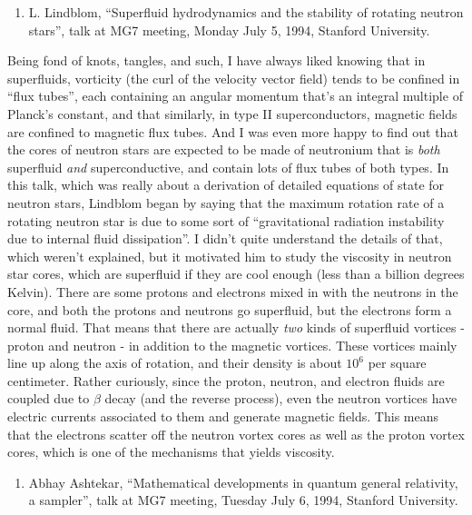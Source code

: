 \documentclass{article}
\def\tightlist{}
\begin{document}
\begin{enumerate}
\def\labelenumi{\arabic{enumi})}
\tightlist
\item
  L. Lindblom, ``Superfluid hydrodynamics and the stability of rotating
  neutron stars'', talk at MG7 meeting, Monday July 5, 1994, Stanford
  University.
\end{enumerate}

Being fond of knots, tangles, and such, I have always liked knowing that
in superfluids, vorticity (the curl of the velocity vector field) tends
to be confined in ``flux tubes'', each containing an angular momentum
that's an integral multiple of Planck's constant, and that similarly, in
type II superconductors, magnetic fields are confined to magnetic flux
tubes. And I was even more happy to find out that the cores of neutron
stars are expected to be made of neutronium that is \emph{both}
superfluid \emph{and} superconductive, and contain lots of flux tubes of
both types. In this talk, which was really about a derivation of
detailed equations of state for neutron stars, Lindblom began by saying
that the maximum rotation rate of a rotating neutron star is due to some
sort of ``gravitational radiation instability due to internal fluid
dissipation''. I didn't quite understand the details of that, which
weren't explained, but it motivated him to study the viscosity in
neutron star cores, which are superfluid if they are cool enough (less
than a billion degrees Kelvin). There are some protons and electrons
mixed in with the neutrons in the core, and both the protons and
neutrons go superfluid, but the electrons form a normal fluid. That
means that there are actually \emph{two} kinds of superfluid vortices -
proton and neutron - in addition to the magnetic vortices. These
vortices mainly line up along the axis of rotation, and their density is
about \(10^6\) per square centimeter. Rather curiously, since the
proton, neutron, and electron fluids are coupled due to \(\beta\) decay
(and the reverse process), even the neutron vortices have electric
currents associated to them and generate magnetic fields. This means
that the electrons scatter off the neutron vortex cores as well as the
proton vortex cores, which is one of the mechanisms that yields
viscosity.

\begin{enumerate}
\def\labelenumi{\arabic{enumi})}
\setcounter{enumi}{1}
\tightlist
\item
  Abhay Ashtekar, ``Mathematical developments in quantum general
  relativity, a sampler'', talk at MG7 meeting, Tuesday July 6, 1994,
  Stanford University.
\end{enumerate}
\end{document}
